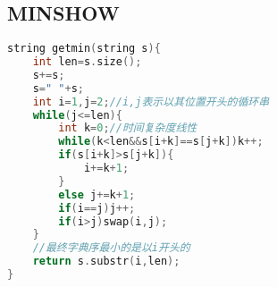 \subsection{MINSHOW}
\begin{lstlisting}[language=C++]
string getmin(string s){
	int len=s.size();
	s+=s;
	s=" "+s;
	int i=1,j=2;//i,j表示以其位置开头的循环串
	while(j<=len){
		int k=0;//时间复杂度线性
		while(k<len&&s[i+k]==s[j+k])k++;
		if(s[i+k]>s[j+k]){
			i+=k+1;
		}
		else j+=k+1;
		if(i==j)j++;
		if(i>j)swap(i,j);
	}
    //最终字典序最小的是以i开头的
	return s.substr(i,len);
}
\end{lstlisting}
